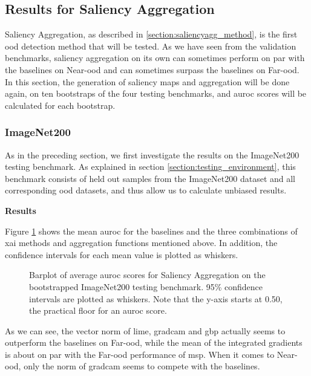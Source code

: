 \documentclass[UKenglish]{uiomasterthesis} %
\theoremstyle{definition}
\begin{document}
\subsection{Results for Saliency Aggregation} \label{section:salagg_results}

Saliency Aggregation, as described in \ref{section:saliencyagg_method}, is the first \ac{ood} detection method that will be tested. As we have seen from the validation benchmarks, saliency aggregation on its own can sometimes perform on par with the baselines on Near-\ac{ood} and can sometimes surpass the baselines on Far-\ac{ood}. In this section, the generation of saliency maps and aggregation will be done again, on ten bootstraps of the four testing benchmarks, and \ac{auroc} scores will be calculated for each bootstrap.

\subsubsection{ImageNet200}

As in the preceding section, we first investigate the results on the ImageNet200 testing benchmark. As explained in section \ref{section:testing_environment}, this benchmark consists of held out samples from the ImageNet200 dataset and all corresponding \ac{ood} datasets, and thus allow us to calculate unbiased results. 

\noindent \textbf{Results}

\noindent Figure \ref{fig:imagenet200_salagg_bootstrap_barplot} shows the mean \ac{auroc} for the baselines and the three combinations of \ac{xai} methods and aggregation functions mentioned above. In addition, the confidence intervals for each mean value is plotted as whiskers.

\begin{figure}[H]
    \begin{center}
        
    \end{center}
    \caption[ImageNet200 Saliency Aggregation Bootstrap]{Barplot of average \ac{auroc} scores for Saliency Aggregation on the bootstrapped ImageNet200 testing benchmark. 95\% confidence intervals are plotted as whiskers. Note that the y-axis starts at 0.50, the practical floor for an \ac{auroc} score.}
    \label{fig:imagenet200_salagg_bootstrap_barplot}
\end{figure}

As we can see, the vector norm of \ac{lime}, \ac{gradcam} and \ac{gbp} actually seems to outperform the baselines on Far-\ac{ood}, while the mean of the integrated gradients is about on par with the Far-\ac{ood} performance of \ac{msp}. When it comes to Near-\ac{ood}, only the norm of \ac{gradcam} seems to compete with the baselines.
\end{document}
